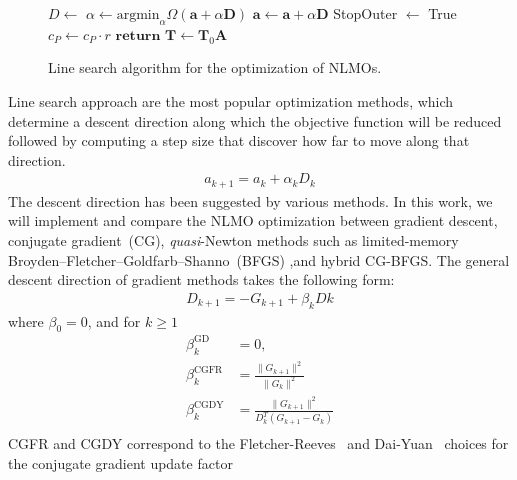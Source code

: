 \documentclass[aps,prl,reprint,amsmath,amssymb]{revtex4-1}
\begin{document}
\begin{figure}
\begin{algorithm}[H]
\begin{algorithmic}[1]
				\State $D \gets $  
				\State $\alpha \gets \text{argmin}_{\alpha} \Omega(\mathbf{a} + \alpha \mathbf{D})$ 
				\State $\mathbf{a}\gets \mathbf{a} + \alpha \mathbf{D}$ 
			\EndIf
			\State StopOuter $\gets$ True
		\EndIf
			\State $c_{P} \gets c_P \cdot r$ 
		\EndIf
	\State $\mathbf{return}$ $\mathbf{T} \gets \mathbf{T}_0 \mathbf{A} $ 
   \end{algorithmic}
\end{algorithm}
\caption{\label{fig:cg} Line search algorithm for the optimization of NLMOs.}
\end{figure}
Line search approach are the most popular optimization methods, which determine a descent direction along which the objective function will be reduced followed by computing a step size that discover how far to move along that direction.
%
\begin{equation} \label{eq:LS_methods}
\begin{split} 
a_{k+1} = a_{k} + \alpha_{k}D_{k}
\end{split}
\end{equation}
%
The descent direction has been suggested by various methods. In this work, we will implement and compare the NLMO optimization between gradient descent, conjugate gradient~(CG),  \emph{quasi}-Newton methods such as limited-memory Broyden–Fletcher–Goldfarb–Shanno~(BFGS) ,and hybrid CG-BFGS. The general descent direction of gradient methods takes the following form:
%
\begin{equation} \label{eq:descent_dir}
\begin{split}
D_{k+1} = -G_{k+1} + \beta_k D{k}
\end{split}
\end{equation}
%
where  $\beta_0=0$, and for $k \geq 1$
\begin{equation} \label{eq:beta}
\begin{split}
\beta_{k}^\text{GD} &= 0, \\
\beta_{k}^\text{CGFR} &= \frac{\lVert{G_{k+1}}\rVert^2}{\lVert{G_{k}}\rVert^2} \\
\beta_{k}^\text{CGDY} &=  \frac{\lVert{G_{k+1}}\rVert^2}{D_{k}^{T}(G_{k+1}-G_{k})} \\
\end{split}
\end{equation}
%
CGFR and CGDY correspond to the Fletcher-Reeves~\citep{fletcher1964function}  and Dai-Yuan~\cite{dai1999nonlinear} choices for the conjugate gradient update factor
\end{document}
